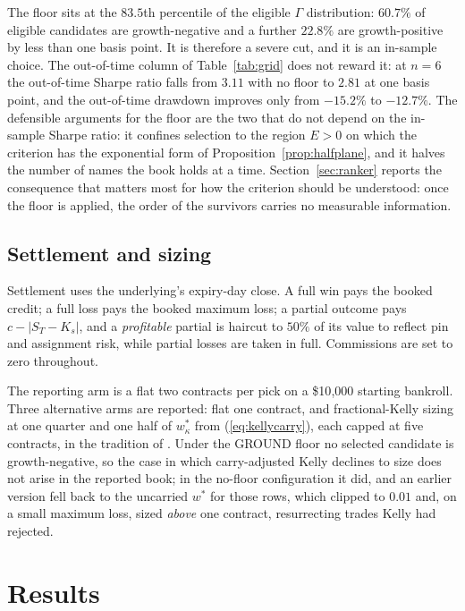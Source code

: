 \documentclass[11pt]{article}
\begin{document}
The floor sits at the $83.5$th percentile of the eligible $\Gamma$
distribution: $60.7\%$ of eligible candidates are growth-negative and a further
$22.8\%$ are growth-positive by less than one basis point. It is therefore a
severe cut, and it is an in-sample choice. The out-of-time column of
Table~\ref{tab:grid} does not reward it: at $n = 6$ the out-of-time Sharpe
ratio falls from $3.11$ with no floor to $2.81$ at one basis point, and the
out-of-time drawdown improves only from $-15.2\%$ to $-12.7\%$. The defensible
arguments for the floor are the two that do not depend on the in-sample
Sharpe ratio: it confines selection to the region $E > 0$ on which the
criterion has the exponential form of Proposition~\ref{prop:halfplane}, and it
halves the number of names the book holds at a time. Section~\ref{sec:ranker}
reports the consequence that matters most for how the criterion should be
understood: once the floor is applied, the order of the survivors carries no
measurable information.

\subsection{Settlement and sizing}
\label{sec:sizing}

Settlement uses the underlying's expiry-day close. A full win pays the booked
credit; a full loss pays the booked maximum loss; a partial outcome pays
$c - |S_T - K_s|$, and a \emph{profitable} partial is haircut to $50\%$ of its
value to reflect pin and assignment risk, while partial losses are taken in
full. Commissions are set to zero throughout.

The reporting arm is a flat two contracts per pick on a \$10{,}000 starting
bankroll. Three alternative arms are reported: flat one contract, and
fractional-Kelly sizing at one quarter and one half of
$w^\ast_\kappa$ from (\ref{eq:kellycarry}), each capped at five contracts, in
the tradition of \cite{maclean2011}. Under the GROUND floor no selected candidate is
growth-negative, so the case in which carry-adjusted Kelly declines to size
does not arise in the reported book; in the no-floor configuration it did, and
an earlier version fell back to the uncarried $w^\ast$ for those rows, which
clipped to $0.01$ and, on a small maximum loss, sized \emph{above} one
contract, resurrecting trades Kelly had rejected.

\section{Results}
\label{sec:results}
\end{document}
